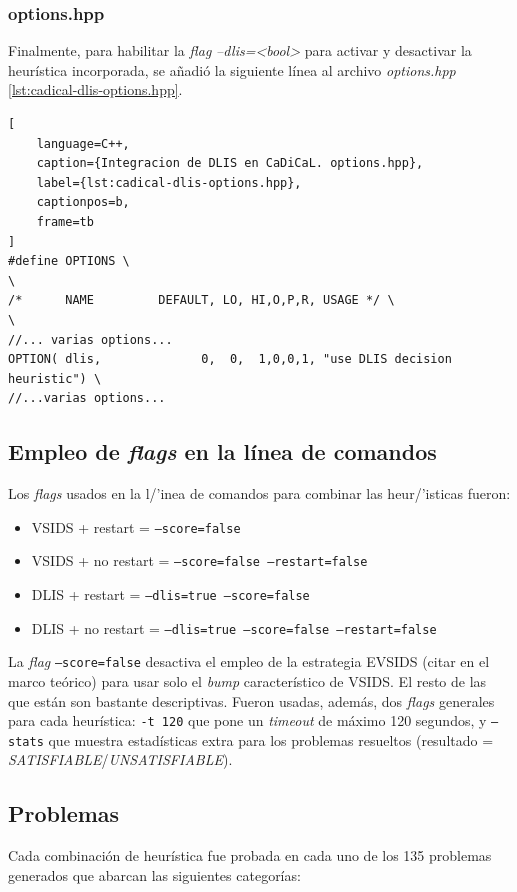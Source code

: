 \subsubsection{options.hpp}
Finalmente, para habilitar la \textit{flag} \textit{--dlis=<bool>} para activar y desactivar la heur\'istica incorporada, se a\~nadi\'o la siguiente l\'inea al archivo \textit{options.hpp} \ref{lst:cadical-dlis-options.hpp}.

\begin{lstlisting}[
    language=C++,
    caption={Integracion de DLIS en CaDiCaL. options.hpp},
    label={lst:cadical-dlis-options.hpp},
    captionpos=b,
    frame=tb
]
#define OPTIONS \
\
/*      NAME         DEFAULT, LO, HI,O,P,R, USAGE */ \
\
//... varias options...
OPTION( dlis,              0,  0,  1,0,0,1, "use DLIS decision heuristic") \
//...varias options...

\end{lstlisting}

\subsection{Empleo de \textit{flags} en la l\'inea de comandos}
Los \textit{flags} usados en la l/'inea de comandos para combinar las heur/'isticas fueron:
\begin{itemize}
    \item VSIDS + restart = \texttt{--score=false}
    \item VSIDS + no restart = \texttt{--score=false --restart=false}
    \item DLIS + restart = \texttt{--dlis=true --score=false}
    \item DLIS + no restart = \texttt{--dlis=true --score=false --restart=false}
\end{itemize}

La \textit{flag} \texttt{--score=false} desactiva el empleo de la estrategia EVSIDS (citar en el marco te\'orico) para usar solo el \textit{bump} caracter\'istico de VSIDS. El resto de las que est\'an son bastante descriptivas. 
Fueron usadas, adem\'as, dos \textit{flags} generales para cada heur\'istica: \texttt{-t 120} que pone un \textit{timeout} de m\'aximo 120 segundos, y \texttt{--stats} que muestra estad\'isticas extra para los problemas resueltos (resultado = \textit{SATISFIABLE}/\textit{UNSATISFIABLE}).

\subsection{Problemas}
Cada combinaci\'on de heur\'istica fue probada en cada uno de los 135 problemas generados que abarcan las siguientes categor\'ias:

